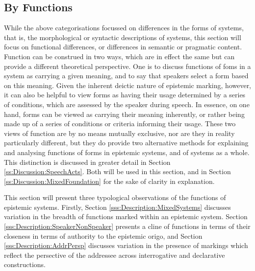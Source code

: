 \subsection{By Functions}\label{ss:Description:ClassByFunction}
While the above categorisations focussed on differences in the forms of systems, that is, the morphological or syntactic descriptions of systems, this section will focus on functional differences, or differences in semantic or pragmatic content. Function can be construed in two ways, which are in effect the same but can provide a different theoretical perspective. One is to discuss functions of foms in a system as carrying a given meaning, and to say that speakers select a form based on this meaning. Given the inherent deictic nature of epistemic marking, however, it can also be helpful to view forms as having their usage determined by a series of conditions, which are assessed by the speaker during speech. In essence, on one hand, forms can be viewed as carrying their meaning inherently, or rather being made up of a series of conditions or criteria informing their usage. These two views of function are by no means mutually exclusive, nor are they in reality particularly different, but they do provide two alternative methods for explaining and analysing functions of forms in epistemic systems, and of systems as a whole. This distinction is discussed in greater detail in Section \ref{ss:Discussion:SpeechActs}. Both will be used in this section, and in Section \ref{ss:Discussion:MixedFoundation} for the sake of clarity in explanation.

This section will present three typological observations of the functions of epistemic systems. Firstly, Section \ref{sss:Description:MixedSystems} discusses variation in the breadth of functions marked within an epistemic system. Section \ref{sss:Description:SpeakerNonSpeaker} presents a cline of functions in terms of their closeness in terms of authority to the epistemic origo, and Section \ref{sss:Description:AddrPersp} discusses variation in the presence of markings which reflect the persective of the addressee across interrogative and declarative constructions.

